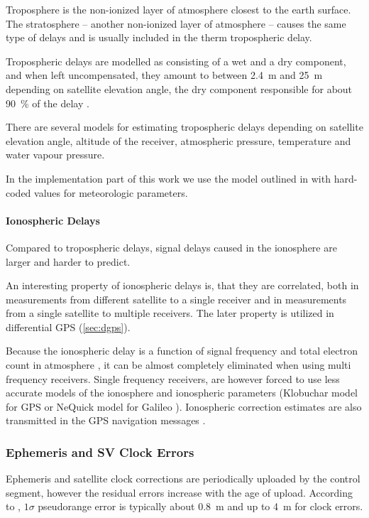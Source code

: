 Troposphere is the non-ionized layer of atmosphere closest to the earth surface.
The stratosphere -- another non-ionized layer of atmosphere -- causes the same
type of delays and is usually included in the therm tropospheric delay.

Tropospheric delays are modelled as consisting of a wet and a dry component,
and when left uncompensated, they amount to between \SI{2.4}{\meter} and \SI{25}{\meter}
depending on satellite elevation angle, the dry component
responsible for about \SI{90}{\percent} of the delay \cite{kaplan06}.

There are several models for estimating tropospheric delays depending on satellite
elevation angle, altitude of the receiver, atmospheric pressure, temperature and
water vapour pressure.

In the implementation part of this work we use the model outlined in \cite{navipedia-tropospheric}
with hard-coded values for meteorologic parameters.

\paragraph{Ionospheric Delays}

Compared to tropospheric delays, signal delays caused in the ionosphere are larger and
harder to predict.

An interesting property of ionospheric delays is, that they are correlated,
both in measurements from different satellite to a single receiver and in measurements
from a single satellite to multiple receivers.
The later property is utilized in differential GPS (\cref{sec:dgps}).

Because the ionospheric delay is a function of signal frequency and total electron
count in atmosphere \cite{kaplan06}, it can be almost completely
eliminated when using multi frequency receivers.
Single frequency receivers, are however forced to use less accurate
models of the ionosphere and ionospheric parameters (Klobuchar model for GPS
\cite{navipedia-klobuchar} or NeQuick model for Galileo \cite{navipedia-nequick}).
Ionospheric correction estimates are also transmitted in the GPS navigation
messages \cite{fyfe92}.

\subsubsection{Ephemeris and SV Clock Errors}

Ephemeris and satellite clock corrections are periodically uploaded by the control
segment, however the residual errors increase with the age of upload.
According to \cite{kaplan06}, \(1 \sigma\) pseudorange error is typically about \SI{0.8}{\meter}
and up to \SI{4}{\meter} for clock errors.

